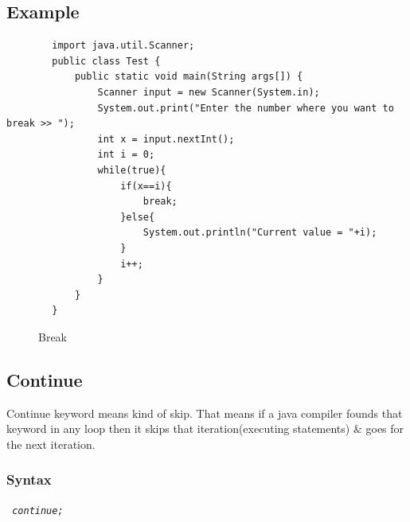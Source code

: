 \documentclass[openany]{book}  %
\begin{document}
\subsection{Example}
\begin{center}
    \begin{verbatim}
        import java.util.Scanner;
        public class Test {
            public static void main(String args[]) {
                Scanner input = new Scanner(System.in);
                System.out.print("Enter the number where you want to break >> ");
                int x = input.nextInt();
                int i = 0;
                while(true){
                    if(x==i){
                        break;
                    }else{
                        System.out.println("Current value = "+i);
                    }
                    i++;
                }
            }
        }
    \end{verbatim}
\end{center}
% 
%
\begin{figure}[htbp]
    \begin{center}
        \caption{Break}
    \end{center}
\end{figure}
% 
% 
\subsection{Continue}
Continue keyword means kind of skip. That means if a java compiler
founds that keyword in any loop then it skips that iteration(executing statements)
\& goes for the next iteration.
% 
% 
\subsubsection{Syntax}
\begin{center}
    \tt{
        \textit{continue;}
    }
\end{center}
% 
% 
\end{document}
